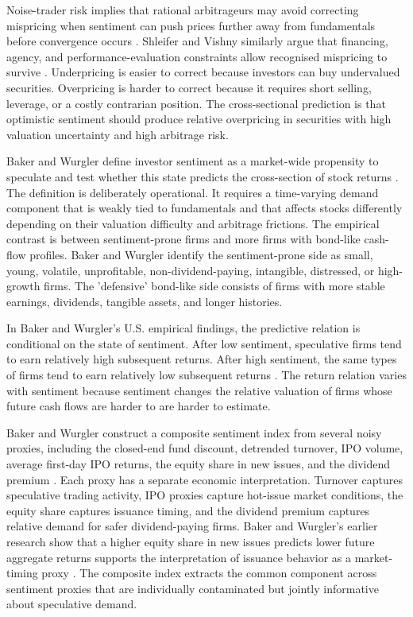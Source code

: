 \documentclass[11pt]{article}
\begin{document}
Noise-trader risk implies that rational arbitrageurs may avoid correcting mispricing when sentiment can push prices further away from fundamentals before convergence occurs \citep{delong1990noise}. Shleifer and Vishny similarly argue that financing, agency, and performance-evaluation constraints allow recognised mispricing to survive \citep{shleifer1997limits}. Underpricing is easier to correct because investors can buy undervalued securities. Overpricing is harder to correct because it requires short selling, leverage, or a costly contrarian position. The cross-sectional prediction is that optimistic sentiment should produce relative overpricing in securities with high valuation uncertainty and high arbitrage risk.

Baker and Wurgler define investor sentiment as a market-wide propensity to speculate and test whether this state predicts the cross-section of stock returns \citep{baker2006sentiment,baker2007}. The definition is deliberately operational. It requires a time-varying demand component that is weakly tied to fundamentals and that affects stocks differently depending on their valuation difficulty and arbitrage frictions. The empirical contrast is between sentiment-prone firms and more firms with bond-like cash-flow profiles. Baker and Wurgler identify the sentiment-prone side as small, young, volatile, unprofitable, non-dividend-paying, intangible, distressed, or high-growth firms. The 'defensive' bond-like side consists of firms with more stable earnings, dividends, tangible assets, and longer histories.

In Baker and Wurgler's U.S. empirical findings, the predictive relation is conditional on the state of sentiment. After low sentiment, speculative firms tend to earn relatively high subsequent returns. After high sentiment, the same types of firms tend to earn relatively low subsequent returns \citep{baker2006sentiment}. The return relation varies with sentiment because sentiment changes the relative valuation of firms whose future cash flows are harder to are harder to estimate.

Baker and Wurgler construct a composite sentiment index from several noisy proxies, including the closed-end fund discount, detrended turnover, IPO volume, average first-day IPO returns, the equity share in new issues, and the dividend premium \citep{baker2006sentiment,baker2007}. Each proxy has a separate economic interpretation. Turnover captures speculative trading activity, IPO proxies capture hot-issue market conditions, the equity share captures issuance timing, and the dividend premium captures relative demand for safer dividend-paying firms. Baker and Wurgler's earlier research show that a higher equity share in new issues predicts lower future aggregate returns supports the interpretation of issuance behavior as a market-timing proxy \citep{baker2000equityshare}. The composite index extracts the common component across sentiment proxies that are individually contaminated but jointly informative about speculative demand.
\end{document}

